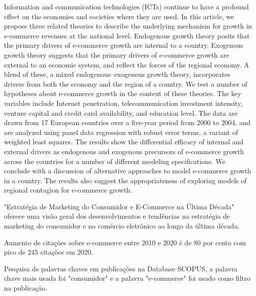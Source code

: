 Information and communication technologies (ICTs) continue to have a profound effect on the economies and societies where they are used. In this article, we propose three related theories to describe the underlying mechanism for growth in e-commerce revenues at the national level. Endogenous growth theory posits that the primary drivers of e-commerce growth are internal to a country. Exogenous growth theory suggests that the primary drivers of e-commerce growth are external to an economic system, and reflect the forces of the regional economy. A blend of these, a mixed endogenous–exogenous growth theory, incorporates drivers from both the economy and the region of a country. We test a number of hypotheses about e-commerce growth in the context of these theories. The key variables include Internet penetration, telecommunication investment intensity, venture capital and credit card availability, and education level. The data are drawn from 17 European countries over a five-year period from 2000 to 2004, and are analyzed using panel data regression with robust error terms, a variant of weighted least squares. The results show the differential efficacy of internal and external drivers as endogenous and exogenous precursors of e-commerce growth across the countries for a number of different modeling specifications. We conclude with a discussion of alternative approaches to model e-commerce growth in a country. The results also suggest the appropriateness of exploring models of regional contagion for e-commerce growth.

		\begin{lacuna}
		\label{lacuna:lacuna1}
			 "Estratégia de Marketing do Consumidor e E-Commerce na Última Década" oferece uma visão geral dos desenvolvimentos e tendências na estratégia de marketing do consumidor e no comércio eletrônico ao longo da última década.
		\end{lacuna}
	
		\begin{pergunta}
		\label{pergunta:pergunta_1}
			Aumento de citações sobre e-commerce entre 2010 e 2020 é de 80 por cento com pico de 245 citações em 2020.
		\end{pergunta}
  \begin{pergunta}
		\label{pergunta:pergunta_2}
			Pesquisa de palavras chaves  em publicações na Database SCOPUS, a palavra chave mais usada foi "consumidor" e a palavra "e-commerce" foi usado como filtro na publicação.
		\end{pergunta}